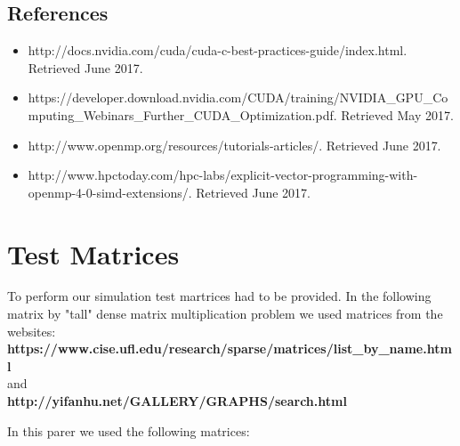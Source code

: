 \documentclass{scrreprt}
\begin{document}
\section{References}

\begin{itemize}
\item http://docs.nvidia.com/cuda/cuda-c-best-practices-guide/index.html. Retrieved June 2017.
\item https://developer.download.nvidia.com/CUDA/training/NVIDIA_GPU_Computing_Webinars_Further_CUDA_Optimization.pdf. Retrieved May 2017.
\item http://www.openmp.org/resources/tutorials-articles/. Retrieved June 2017.
\item http://www.hpctoday.com/hpc-labs/explicit-vector-programming-with-openmp-4-0-simd-extensions/. Retrieved June 2017.
\end{itemize}



\chapter{Test Matrices}

To perform our simulation test martrices had to be provided. In the following matrix by "tall" dense matrix multiplication problem we used matrices from the websites: \\
\textbf{https://www.cise.ufl.edu/research/sparse/matrices/list_by_name.html} \\
and \\
\textbf{http://yifanhu.net/GALLERY/GRAPHS/search.html}

In this parer we used the following matrices:




\setlength{\arrayrulewidth}{1mm}
\setlength{\tabcolsep}{12pt}
\renewcommand{\arraystretch}{3}
 
 
\end{document}
